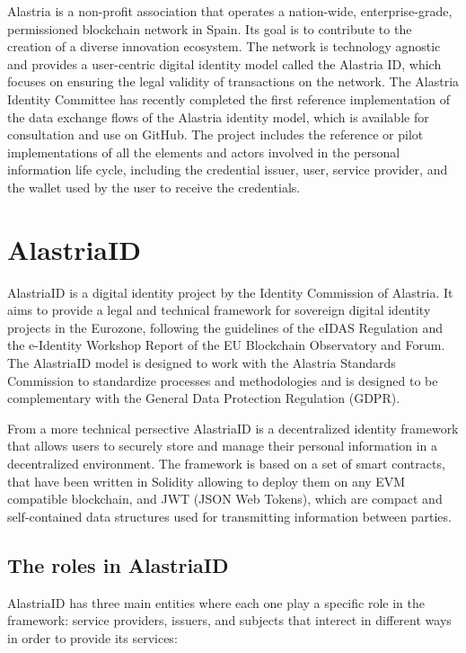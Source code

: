 \documentclass[target=mst,aauheader=]{thud}
\begin{document}
Alastria is a non-profit association that operates a nation-wide, enterprise-grade, permissioned blockchain network in Spain. Its goal is to contribute to the creation of a diverse innovation ecosystem. The network is technology agnostic and provides a user-centric digital identity model called the Alastria ID, which focuses on ensuring the legal validity of transactions on the network. The Alastria Identity Committee has recently completed the first reference implementation of the data exchange flows of the Alastria identity model, which is available for consultation and use on GitHub. The project includes the reference or pilot implementations of all the elements and actors involved in the personal information life cycle, including the credential issuer, user, service provider, and the wallet used by the user to receive the credentials.

\section{AlastriaID}

AlastriaID is a digital identity project by the Identity Commission of Alastria. It aims to provide a legal and technical framework for sovereign digital identity projects in the Eurozone, following the guidelines of the eIDAS Regulation and the e-Identity Workshop Report of the EU Blockchain Observatory and Forum. The AlastriaID model is designed to work with the Alastria Standards Commission to standardize processes and methodologies and is designed to be complementary with the General Data Protection Regulation (GDPR).

From a more technical persective AlastriaID is a decentralized identity framework that allows users to securely store and manage their personal information in a decentralized environment. The framework is based on a set of smart contracts, that have been written in Solidity allowing to deploy them on any EVM compatible blockchain, and JWT (JSON Web Tokens), which are compact and self-contained data structures used for transmitting information between parties. 

\subsection{The roles in AlastriaID}

AlastriaID has three main entities where each one play a specific role in the framework: service providers, issuers, and subjects that interect in different ways in order to provide its services:
\end{document}
